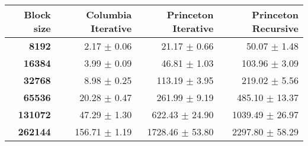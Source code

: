 \begin{tabular}{rrrr}\toprule
\textbf{Block size}  & \textbf{Columbia Iterative} & \textbf{Princeton Iterative} & \textbf{Princeton Recursive}\\\midrule
\textbf{8192}  & 2.17 $\pm$ 0.06 & 21.17 $\pm$ 0.66 & 50.07 $\pm$ 1.48\\
\textbf{16384}  & 3.99 $\pm$ 0.09 & 46.81 $\pm$ 1.03 & 103.96 $\pm$ 3.09\\
\textbf{32768}  & 8.98 $\pm$ 0.25 & 113.19 $\pm$ 3.95 & 219.02 $\pm$ 5.56\\
\textbf{65536}  & 20.28 $\pm$ 0.47 & 261.99 $\pm$ 9.19 & 485.10 $\pm$ 13.37\\
\textbf{131072}  & 47.29 $\pm$ 1.30 & 622.43 $\pm$ 24.90 & 1039.49 $\pm$ 26.97\\
\textbf{262144} & 156.71 $\pm$ 1.19 & 1728.46 $\pm$ 53.80 & 2297.80 $\pm$ 58.29\\
\bottomrule
\end{tabular}
